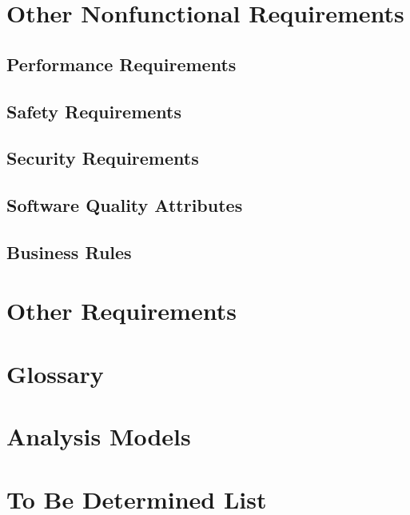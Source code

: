 \chapter{Other Nonfunctional Requirements}
\label{Other Nonfunctional Requirements}

\section{Performance Requirements}
\section{Safety Requirements}
\section{Security Requirements}
\section{Software Quality Attributes}
\section{Business Rules}

\chapter{Other Requirements}
\label{Other Requirements}

\begin{appendices}
\chapter{Glossary}
\chapter{Analysis Models}
\chapter{To Be Determined List}


\end{appendices}


